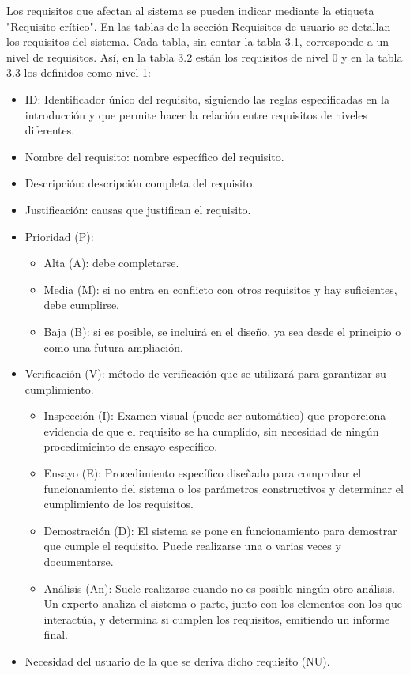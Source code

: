Los requisitos que afectan al sistema se pueden indicar mediante la etiqueta "Requisito crítico". En las tablas de la sección Requisitos de usuario se detallan los requisitos del sistema. Cada tabla, sin contar la tabla 3.1, corresponde a un nivel de requisitos. Así, en la tabla 3.2 están los requisitos de nivel 0 y en la tabla 3.3 los definidos como nivel 1:


\begin{itemize}
    \item ID: Identificador único del requisito, siguiendo las reglas especificadas en la introducción y que permite hacer la relación entre requisitos de niveles diferentes.
    \item Nombre del requisito: nombre específico del requisito.
    \item Descripción: descripción completa del requisito.
    \item Justificación: causas que justifican el requisito.
    \item Prioridad (P):
    \begin{itemize}
        \item Alta (A): debe completarse.
        \item Media (M): si no entra en conflicto con otros requisitos y hay suficientes, debe cumplirse.
        \item Baja (B): si es posible, se incluirá en el diseño, ya sea desde el principio o como una futura ampliación.
    \end{itemize}
    \item Verificación (V): método de verificación que se utilizará para garantizar su cumplimiento.
    \begin{itemize}
        \item Inspección (I): Examen visual (puede ser automático) que proporciona evidencia de que el requisito se ha cumplido, sin necesidad de ningún procedimieinto de ensayo específico.
        \item Ensayo (E): Procedimiento específico diseñado para comprobar el funcionamiento del sistema o los parámetros constructivos y determinar el cumplimiento de los requisitos.
        \item Demostración (D): El sistema se pone en funcionamiento para demostrar que cumple el requisito. Puede realizarse una o varias veces y documentarse.
        \item Análisis (An): Suele realizarse cuando no es posible ningún otro análisis. Un experto analiza el sistema o parte, junto con los elementos con los que interactúa, y determina si cumplen los requisitos, emitiendo un informe final.
    \end{itemize}
    \item Necesidad del usuario de la que se deriva dicho requisito (NU).
\end{itemize}

